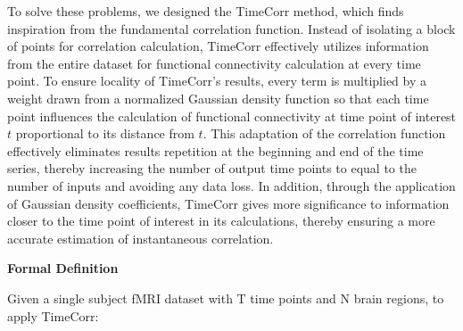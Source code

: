 \documentclass[12pt]{article}
\begin{document}
To solve these problems, we designed the TimeCorr method, which finds inspiration from the fundamental correlation function. Instead of isolating a block of points for correlation calculation, TimeCorr effectively utilizes information from the entire dataset for functional connectivity calculation at every time point. To ensure locality of TimeCorr's results, every term is multiplied by a weight drawn from a normalized Gaussian density function so that each time point influences the calculation of functional connectivity at time point of interest $t$ proportional to its distance from $t$. This adaptation of the correlation function effectively eliminates results repetition at the beginning and end of the time series, thereby increasing the number of output time points to equal to the number of inputs and avoiding any data loss. In addition, through the application of Gaussian density coefficients, TimeCorr gives more significance to information closer to the time point of interest in its calculations, thereby ensuring a more accurate estimation of instantaneous correlation.

\large{\textbf{Formal Definition}}

\normalsize
Given a single subject fMRI dataset with T time points and N brain regions, to apply TimeCorr:
\end{document}
